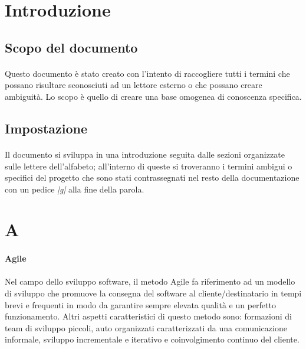 \documentclass[10pt, a4paper]{article}
\title{\titolo}
\author{SWEetCode}
\begin{document}



\newpage

\tableofcontents
\newpage

\section{Introduzione}
\subsection{Scopo del documento}
\paragraph{}Questo documento è stato creato con l'intento di raccogliere tutti i termini che possano risultare sconosciuti ad un lettore esterno o che possano creare ambiguità. Lo scopo è quello di creare una base omogenea di conoscenza specifica. 

\subsection{Impostazione}
\paragraph{}Il documento si sviluppa in una introduzione seguita dalle sezioni organizzate sulle lettere dell'alfabeto; all'interno di queste si troveranno i termini ambigui o specifici del progetto che sono stati contrassegnati nel resto della documentazione con un pedice \textit{|g|} alla fine della parola.





\section{A}
\vspace{2em}
\paragraph{Agile}\noindent\hrulefill
\paragraph{}Nel campo dello sviluppo software, il metodo Agile fa riferimento ad un modello di sviluppo che promuove la consegna del software al cliente/destinatario in tempi brevi e frequenti in modo da garantire sempre elevata qualità e un perfetto funzionamento.
Altri aspetti caratteristici di questo metodo sono: formazioni di team di sviluppo piccoli, auto organizzati caratterizzati da una comunicazione informale, sviluppo incrementale e iterativo e coinvolgimento continuo del cliente.
\end{document}
